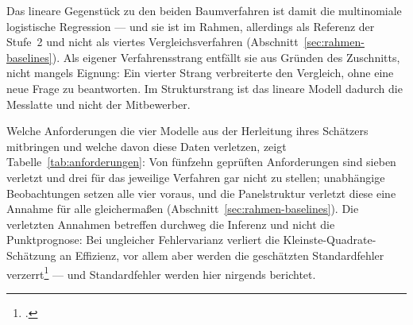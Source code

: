 \documentclass[12pt,a4paper]{article}
\begin{document}
Das lineare Gegenstück zu den beiden Baumverfahren ist damit die multinomiale
logistische Regression --- und sie ist im Rahmen, allerdings als Referenz der
Stufe~2 und nicht als viertes Vergleichsverfahren
(Abschnitt~\ref{sec:rahmen-baselines}). Als eigener Verfahrensstrang entfällt
sie aus Gründen des Zuschnitts, nicht mangels Eignung: Ein vierter Strang
verbreiterte den Vergleich, ohne eine neue Frage zu beantworten. Im Strukturstrang ist das lineare Modell dadurch die Messlatte und nicht der
Mitbewerber.

Welche Anforderungen die vier Modelle aus der Herleitung ihres Schätzers mitbringen und welche davon diese Daten verletzen, zeigt Tabelle~\ref{tab:anforderungen}: Von fünfzehn geprüften Anforderungen sind sieben verletzt und drei für das jeweilige Verfahren gar nicht zu stellen; unabhängige Beobachtungen setzen alle vier voraus, und die Panelstruktur verletzt diese eine Annahme für alle gleichermaßen (Abschnitt~\ref{sec:rahmen-baselines}). Die verletzten Annahmen betreffen durchweg die Inferenz und nicht die Punktprognose: Bei ungleicher Fehlervarianz verliert die Kleinste-Quadrate-Schätzung an Effizienz, vor allem aber werden die geschätzten Standardfehler verzerrt\footcite[1287]{BreuschPagan1979} --- und Standardfehler werden hier nirgends berichtet.
\end{document}
